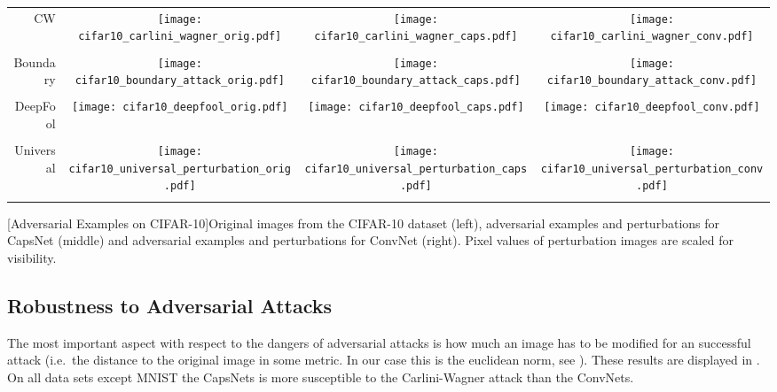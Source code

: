 \begin{center}
\begin{longtable*}{rccc}
	
	CW & \texttt{[image: cifar10\_carlini\_wagner\_orig.pdf]} & \texttt{[image: cifar10\_carlini\_wagner\_caps.pdf]} & \texttt{[image: cifar10\_carlini\_wagner\_conv.pdf]}\\
	\\
	Boundary & \texttt{[image: cifar10\_boundary\_attack\_orig.pdf]} & \texttt{[image: cifar10\_boundary\_attack\_caps.pdf]} & \texttt{[image: cifar10\_boundary\_attack\_conv.pdf]}\\
	\\
	DeepFool & \texttt{[image: cifar10\_deepfool\_orig.pdf]} & \texttt{[image: cifar10\_deepfool\_caps.pdf]} & \texttt{[image: cifar10\_deepfool\_conv.pdf]}\\
	\\
	Universal & \texttt{[image: cifar10\_universal\_perturbation\_orig.pdf]} & \texttt{[image: cifar10\_universal\_perturbation\_caps.pdf]} & \texttt{[image: cifar10\_universal\_perturbation\_conv.pdf]}\\
	\\
\end{longtable*}
[Adversarial Examples on CIFAR-10]{Original images from the CIFAR-10 dataset (left), adversarial examples and perturbations for CapsNet (middle) and adversarial examples and perturbations for ConvNet (right). Pixel values of perturbation images are scaled for visibility.}
\label{fig:images}
\end{center}

\subsection{Robustness to Adversarial Attacks}

The most important aspect with respect to the dangers of adversarial attacks is how much an image has to be modified for an successful attack
(i.e.\ the distance to the original image in some metric. In our case this is the euclidean norm, see ).
These results are displayed in .
On all data sets except MNIST the CapsNets is more susceptible to the Carlini-Wagner attack than the ConvNets.

